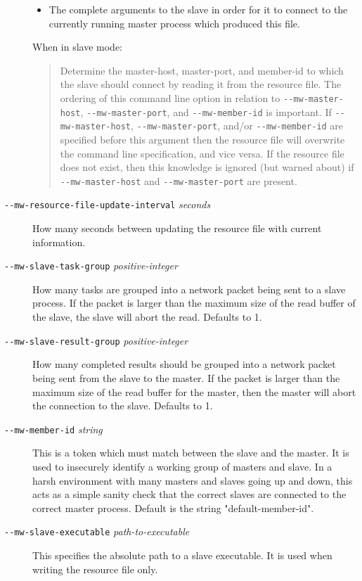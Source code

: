 \documentclass[titlepage,12pt]{book}
\newcommand{\dash}{\texttt{-}}
\newcommand{\Option}[1]{\dash\dash\texttt{#1}}
\newcommand{\OptionV}[2]{\dash\dash\texttt{#1} \textit{#2}}
\begin{document}
\begin{description}
\begin{itemize}
		\item The complete arguments to the slave in order for it to
			connect to the currently running master process which 
			produced this file.
    \end{itemize}
    When in slave mode:
	\begin{quotation}
      Determine the master-host, master-port, and member-id to which
      the slave should connect by reading it from the resource file.
      The ordering of this command line option in relation to
      \Option{mw-master-host}, \Option{mw-master-port}, and 
	  \Option{mw-member-id} is
      important. If \Option{mw-master-host}, \Option{mw-master-port}, and/or
      \Option{mw-member-id} are specified before this argument then the
      resource file will overwrite the command line specification,
      and vice versa. If the resource file does not exist, then this
      knowledge is ignored (but warned about) if \Option{mw-master-host}
      and \Option{mw-master-port} are present.
	\end{quotation}
\item[\OptionV{mw-resource-file-update-interval}{seconds}]
    How many seconds between updating the resource file with current
    information.
\item[\OptionV{mw-slave-task-group}{positive-integer}]
    How many tasks are grouped into a network packet being sent
    to a slave process. If the packet is larger than the maximum
    size of the read buffer of the slave, the slave will abort the
    read. Defaults to 1.
\item[\OptionV{mw-slave-result-group}{positive-integer}]
    How many completed results should be grouped into a network packet
    being sent from the slave to the master. If the packet is larger than the
    maximum size of the read buffer for the master, then the master will
    abort the connection to the slave. Defaults to 1.
\item[\OptionV{mw-member-id}{string}]
    This is a token which must match between the slave and the master. It is
    used to insecurely identify a working group of masters and slave. In a
    harsh environment with many masters and slaves going up and down, this
    acts as a simple sanity check that the correct slaves are connected to the
    correct master process. Default is the string "default-member-id".
\item[\OptionV{mw-slave-executable}{path-to-executable}]
    This specifies the absolute path to a slave executable. It is used
    when writing the resource file only.
\end{description}
\end{document}
